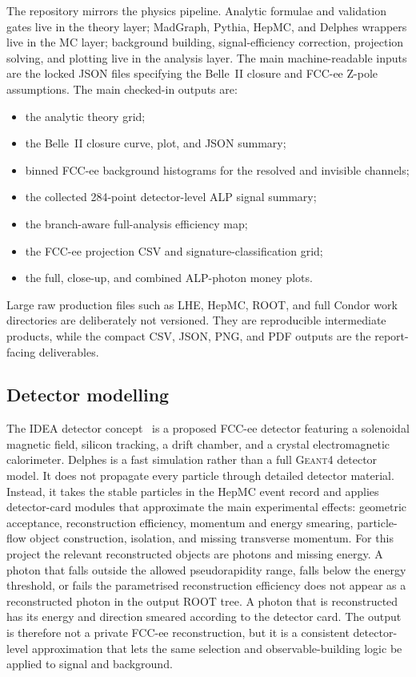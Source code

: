 \documentclass[12pt,a4paper]{article}
\begin{document}
The repository mirrors the physics pipeline. Analytic formulae and validation
gates live in the theory layer; MadGraph, Pythia, HepMC, and Delphes wrappers
live in the MC layer; background building, signal-efficiency correction,
projection solving, and plotting live in the analysis layer. The main
machine-readable inputs are the locked JSON files specifying the Belle~II
closure and FCC-ee Z-pole assumptions. The main checked-in outputs are:
\begin{itemize}
    \item the analytic theory grid;
    \item the Belle~II closure curve, plot, and JSON summary;
    \item binned FCC-ee background histograms for the resolved and invisible
    channels;
    \item the collected 284-point detector-level ALP signal summary;
    \item the branch-aware full-analysis efficiency map;
    \item the FCC-ee projection CSV and signature-classification grid;
    \item the full, close-up, and combined ALP-photon money plots.
\end{itemize}
Large raw production files such as LHE, HepMC, ROOT, and full Condor work
directories are deliberately not versioned. They are reproducible intermediate
products, while the compact CSV, JSON, PNG, and PDF outputs are the
report-facing deliverables.

\subsection{Detector modelling}

The IDEA detector concept~\cite{IDEA} is a proposed FCC-ee detector featuring
a solenoidal magnetic field, silicon tracking, a drift chamber, and a
crystal electromagnetic calorimeter.
Delphes is a fast simulation rather than a full \textsc{Geant4} detector model.
It does not propagate every particle through detailed detector material.
Instead, it takes the stable particles in the HepMC event record and applies
detector-card modules that approximate the main experimental effects:
geometric acceptance, reconstruction efficiency, momentum and energy smearing,
particle-flow object construction, isolation, and missing transverse momentum.
For this project the relevant reconstructed objects are photons and missing
energy. A photon that falls outside the allowed pseudorapidity range, falls
below the energy threshold, or fails the parametrised reconstruction efficiency
does not appear as a reconstructed photon in the output ROOT tree. A photon that
is reconstructed has its energy and direction smeared according to the detector
card. The output is therefore not a private FCC-ee reconstruction, but it is a
consistent detector-level approximation that lets the same selection and
observable-building logic be applied to signal and background.
\end{document}
